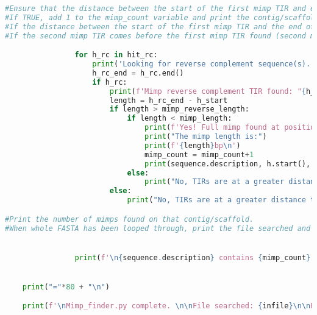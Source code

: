 \begin{lstlisting}[language=Python, caption= Regex based \textit{mimp} searching script.]
#Ensure that the distance between the start of the first mimp TIR and end of the second mimp TIR is not greater than mimp_length (400 nucleotides).
#If TRUE, add 1 to the mimp_count variable and print the contig/scaffold description along with the start location of the mimp and the end location of the mimp in the .bed file opened (ensure fields are \t seperated to maintain .bed file convention).
#If the distance between the start of the first mimp TIR and the end of the second mimp TIR is greater than 400 nucleotides, it is not a mimp.
#If the second mimp TIR comes before the first mimp TIR found (second mimp TIR end - first mimp TIR start < 0), it is not a mimp.

                for h_rc in hit_rc:
                    print('Looking for reverse complement sequence(s)...')
                    h_rc_end = h_rc.end()
                    if h_rc:
                        print(f'Mimp reverse complement TIR found: "{h_rc.group()}" at position {h_rc.start()} to {h_rc.end()}.  Is this complete mimp?')
                        length = h_rc_end - h_start
                        if length > mimp_reverse_length:
                            if length < mimp_length:
                                print(f'Yes! Full mimp found at position {h.start()} to {h_rc.end()}.')
                                print("The mimp length is:")
                                print(f'{length}bp\n')
                                mimp_count = mimp_count+1
                                print(sequence.description, h.start(), h_rc.end(), "+", file=file_object, sep="\t")
                            else:
                                print("No, TIRs are at a greater distance than 400bp. \nOnly a partial mimp.\n")
                        else:
                            print("No, TIRs are at a greater distance than 400bp")

#Print the number of mimps found on that contig/scaffold.
#When whole FASTA has been looped through, print the file searched and time finished.


                print(f'\n{sequence.description} contains {mimp_count} mimp(s)')


    print("="*80 + "\n")

    print(f'\nMimp_finder.py complete. \n\nFile searched: {infile}\n\nFinished at: {startTime}')
\end{lstlisting}
